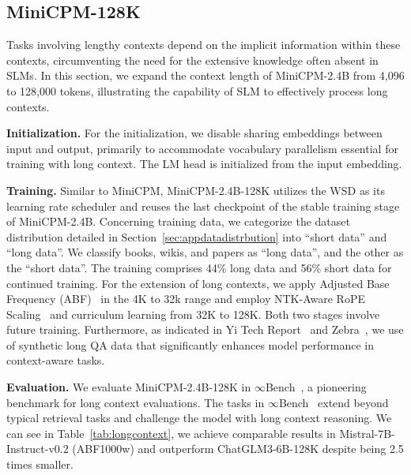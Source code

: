 
\subsection{MiniCPM-128K}
Tasks involving lengthy contexts depend on the implicit information within these contexts, circumventing the need for the extensive knowledge often absent in SLMs. In this section, we expand the context length of MiniCPM-2.4B from 4,096 to 128,000 tokens, illustrating the capability of SLM to effectively process long contexts.


\textbf{Initialization.}
For the initialization, we disable sharing embeddings between input and output, primarily to accommodate vocabulary parallelism essential for training with long context. The LM head is initialized from the input embedding.

\textbf{Training.}
Similar to MiniCPM, MiniCPM-2.4B-128K utilizes the WSD as its learning rate scheduler and reuses the last checkpoint of the stable training stage of MiniCPM-2.4B. Concerning training data, we categorize the dataset distribution detailed in Section~\ref{sec:appdatadistrbution} into ``short data'' and ``long data''. We classify books, wikis, and papers as ``long data'', and the other as the ``short data''. The training comprises 44\% long data and 56\% short data for continued training. For the extension of long contexts, we apply Adjusted Base Frequency (ABF)~\citep{xiong2023effective} in the 4K to 32k range and employ NTK-Aware RoPE Scaling~\citep{bloc97_2023_ntk} and curriculum learning from 32K to 128K. Both two stages involve future training. Furthermore, as indicated in Yi Tech Report~\citep{young2024yi} and Zebra~\citep{song2023zebra}, we use of synthetic long QA data that significantly enhances model performance in context-aware tasks.

\textbf{Evaluation.} We evaluate MiniCPM-2.4B-128K in $\infty$Bench~\citep{zhang2024infty}, a pioneering benchmark for long context evaluations. The tasks in $\infty$Bench~\citep{zhang2024infty} extend beyond typical retrieval tasks and challenge the model with long context reasoning. We can see in Table~\ref{tab:longcontext}, we achieve comparable results in Mistral-7B-Instruct-v0.2 (ABF1000w) and outperform ChatGLM3-6B-128K despite being 2.5 times smaller. 

